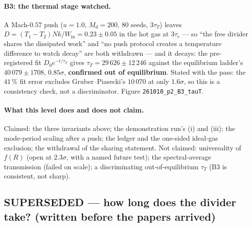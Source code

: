 \documentclass[11pt,a4paper]{article}
\begin{document}
\paragraph{B3: the thermal stage watched.} A Mach-$0.57$ push ($u = 1.0$, $M_d = 200$, 80 seeds,
$3\tau_T$) leaves $D = (T_1 - T_2)Nk/W_{\mathrm{in}} = 0.23 \pm 0.05$ in the hot gas at $3\tau_r$
--- so ``the free divider shares the dissipated work'' and ``no push protocol creates a temperature
difference to watch decay'' are both withdrawn --- and it decays: the pre-registered fit
$D_0 e^{-t/\tau_T}$ gives $\tau_T = 29\,626 \pm 12\,246$ against the equilibrium ladder's
$40\,079 \pm 1708$, $0.85\sigma$, \textbf{confirmed out of equilibrium}. Stated with the pass: the
$41\,\%$ fit error excludes Gruber--Piasecki's $10\,070$ at only $1.6\sigma$, so this is a
consistency check, not a discriminator. Figure \texttt{261010\_p2\_B3\_tauT}.

\paragraph{What this level does and does not claim.} Claimed: the three invariants above; the
demonstration run's (i) and (iii); the mode-period scaling after a push; the ledger and the
one-sided ideal-gas exclusion; the withdrawal of the sharing statement. Not claimed: universality
of $f(R)$ (open at $2.3\sigma$, with a named future test); the spectral-average transmission
(failed on scale); a discriminating out-of-equilibrium $\tau_T$ (B3 is consistent, not sharp).

\subsection{SUPERSEDED --- how long does the divider take? (written before the papers arrived)}
\label{sec:l4tau-superseded}

\begin{center}\end{center}
\end{document}
